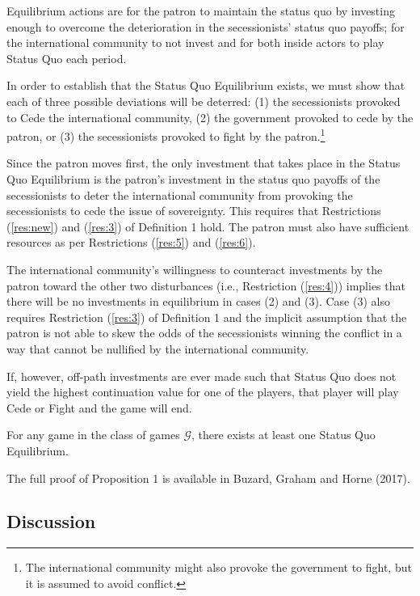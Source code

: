 Equilibrium actions are for the patron to maintain the status quo by investing enough to overcome the deterioration in the secessionists' status quo payoffs; for the international community to not invest and for both inside actors to play Status Quo each period.

In order to establish that the Status Quo Equilibrium exists, we must show that each of three possible deviations will be deterred: (1) the secessionists provoked to Cede the international community, (2) the government provoked to cede by the patron, or (3) the secessionists provoked to fight by the patron.\footnote{The international community might also provoke the government to fight, but it is assumed to avoid conflict.} 

Since the patron moves first, the only investment that takes place in the Status Quo Equilibrium is the patron's investment in the status quo payoffs of the secessionists to deter the international community from provoking the secessionists to cede the issue of sovereignty. This requires that Restrictions (\ref{res:new}) and (\ref{res:3}) of Definition 1 hold. The patron must also have sufficient resources as per Restrictions (\ref{res:5}) and (\ref{res:6}).

The international community's willingness to counteract investments by the patron toward the other two disturbances (i.e., Restriction (\ref{res:4})) implies that there will be no investments in equilibrium in cases (2) and (3). Case (3) also requires Restriction (\ref{res:3}) of Definition 1 and the implicit assumption that the patron is not able to skew the odds of the secessionists winning the conflict in a way that cannot be nullified by the international community. 

If, however, off-path investments are ever made such that Status Quo does not yield the highest continuation value for one of the players, that player will play Cede or Fight and the game will end.

\begin{proposition}
	For any game in the class of games $\mathcal{G}$, there exists at least one Status Quo Equilibrium.
\end{proposition}

The full proof of Proposition 1 is available in Buzard, Graham and Horne (2017).


\subsection{Discussion}

